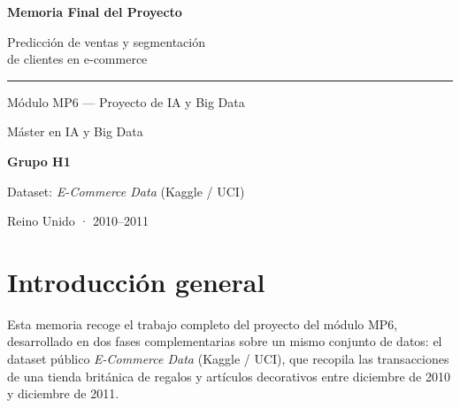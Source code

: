 \documentclass[11pt,a4paper]{article}
\begin{document}
\renewcommand{\contentsname}{Índice}
\renewcommand{\tablename}{Cuadro}
\renewcommand{\figurename}{Figura}
\renewcommand{\refname}{Referencias}
\renewcommand{\partname}{Parte}

\begin{titlepage}
\centering
\vspace*{2cm}

{\Huge\bfseries\textcolor{azultfm}{Memoria Final del Proyecto}\par}
\vspace{0.5cm}
{\LARGE Predicción de ventas y segmentación\\[0.2cm] de clientes en e-commerce\par}

\vspace{1.5cm}
\rule{0.6\textwidth}{1.5pt}\par
\vspace{1cm}

{\large Módulo MP6 — Proyecto de IA y Big Data\par}
{\large Máster en IA y Big Data\par}

\vspace{2cm}

{\large\bfseries Grupo H1\par}

\vfill

{\large Dataset: \textit{E-Commerce Data} (Kaggle / UCI)\par}
{\large Reino Unido · 2010–2011\par}

\vspace{1cm}
\end{titlepage}

\tableofcontents
\newpage

\section*{Introducción general}

Esta memoria recoge el trabajo completo del proyecto del módulo MP6, desarrollado en dos fases complementarias sobre un mismo conjunto de datos: el dataset público \textit{E-Commerce Data} (Kaggle / UCI), que recopila las transacciones de una tienda británica de regalos y artículos decorativos entre diciembre de 2010 y diciembre de 2011.
\end{document}
